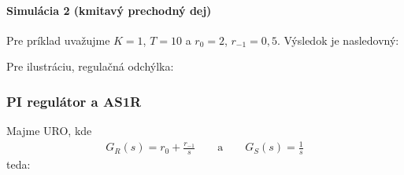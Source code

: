 \documentclass[a4paper, 10pt, ]{article}
\begin{document}
\paragraph{Simulácia 2 (kmitavý prechodný dej)}

Pre príklad uvažujme $K = 1$, $T = 10$ a $r_0 = 2$, $r_{-1} = 0,5$. Výsledok je nasledovný:

\begin{center}



    \figcaption{}

\end{center}

\noindent
Pre ilustráciu, regulačná odchýlka:


\begin{center}



    \figcaption{}

\end{center}









\subsubsection{PI regulátor a AS1R}

Majme URO, kde
\begin{align}
    G_R(s) = r_0 + \frac{r_{-1}}{s} \qquad \text{a} \qquad  G_S(s) = \frac{1}{s}
\end{align}
teda:

\begin{center}

    \makebox[\textwidth][c]{%
    
    }

	\figcaption{}
	\label{URO_PI_AS1R}

\end{center}
\end{document}
